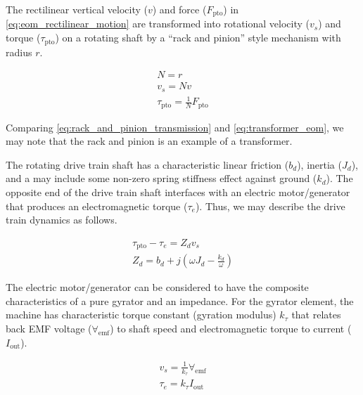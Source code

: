 \documentclass[lettersize,journal]{IEEEtran}
\begin{document}
The rectilinear vertical velocity ($v$) and force ($F_{\textrm{pto}}$) in \eqref{eq:eom_rectilinear_motion} are transformed into rotational velocity ($v_s$) and torque ($\tau_{\textrm{pto}}$) on a rotating shaft by a ``rack and pinion'' style mechanism with radius $r$.

\begin{subequations}
        \begin{gather}
                N = r \\
                v_s = N v \\
                \tau_{\textrm{pto}} = \frac{1}{N} F_{\textrm{pto}}
        \end{gather}
        \label{eq:rack_and_pinion_transmission}
\end{subequations}

\noindent{}Comparing \eqref{eq:rack_and_pinion_transmission} and \eqref{eq:transformer_eom}, we may note that the rack and pinion is an example of a transformer.

The rotating drive train shaft has a characteristic linear friction ($b_d$), inertia ($J_d$), and a may include some non-zero spring stiffness effect against ground ($k_d$).
The opposite end of the drive train shaft interfaces with an electric motor/generator that produces an electromagnetic torque ($\tau_e$).
Thus, we may describe the drive train dynamics as follows.

\begin{subequations}
        \begin{gather}
                \tau_{\textrm{pto}} - \tau_e = Z_d v_s \\
                Z_d = b_d + j \left( \omega J_d - \frac{k_d}{\omega} \right)
        \end{gather}
\end{subequations}

The electric motor/generator can be considered to have the composite characteristics of a pure gyrator and an impedance.
For the gyrator element, the machine has characteristic torque constant (gyration modulus) $k_\tau$ that relates back EMF voltage ($\forall_{\textrm{emf}}$) to shaft speed and electromagnetic torque to current ($I_{\textrm{out}}$).

\begin{subequations}
        \begin{gather}
                v_s = \frac{1}{k_\tau}\forall_{\textrm{emf}} \\
                \tau_e = k_\tau I_{\textrm{out}}
        \end{gather}
\end{subequations}
\end{document}
